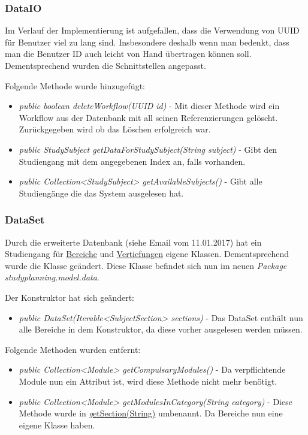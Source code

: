 \documentclass[parskip=full]{scrartcl}
\begin{document}
			\subsubsection{DataIO}
				Im Verlauf der Implementierung ist aufgefallen, dass die Verwendung von UUID für Benutzer viel zu lang sind. Insbesondere deshalb wenn man bedenkt, dass man die Benutzer ID auch \glqq leicht\grqq{} von Hand übertragen können soll. Dementsprechend wurden die Schnittstellen angepasst. 
				
				Folgende Methode wurde hinzugefügt:
				\begin{itemize}
					\item \textit{public boolean deleteWorkflow(UUID id)} - Mit dieser Methode wird ein Workflow aus der Datenbank mit all seinen Referenzierungen gelöscht. Zurückgegeben wird ob das Löschen erfolgreich war.
					\item \textit{public StudySubject getDataForStudySubject(String subject)} - Gibt den Studiengang mit dem angegebenen Index an, falls vorhanden.
					\item \textit{public Collection<StudySubject> getAvailableSubjects()} - Gibt alle Studiengänge die das System ausgelesen hat.
				\end{itemize}
				
			\subsubsection{DataSet}
				Durch die erweiterte Datenbank (siehe Email vom 11.01.2017) hat ein Studiengang für \hyperlink{model:SubjectSection}{Bereiche} und \hyperlink{model:SubjectSpecialization}{Vertiefungen} eigene Klassen. Dementsprechend wurde die Klasse geändert.
				Diese Klasse befindet sich nun im neuen \textit{Package studyplanning.model.data}.
				
				Der Konstruktor hat sich geändert:
				\begin{itemize}
					\item \textit{public DataSet(Iterable<SubjectSection> sections)} - Das DataSet enthält nun alle Bereiche in dem Konstruktor, da diese vorher ausgelesen werden müssen. 
				\end{itemize}
				
				Folgende Methoden wurden entfernt:
				\begin{itemize}
					\item \textit{public Collection<Module> getCompulsaryModules()} - Da verpflichtende Module nun ein Attribut ist, wird diese Methode nicht mehr benötigt.
					\item \textit{public Collection<Module> getModulesInCategory(String category)} - Diese Methode wurde in \hyperlink{model:DataSet:getSection}{\textit getSection(String)} umbenannt. Da Bereiche nun eine eigene Klasse haben.
				\end{itemize}
				 
\end{document}
